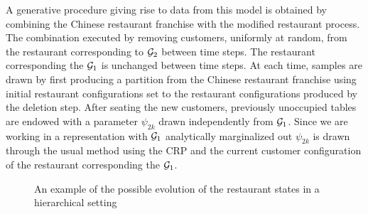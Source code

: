 A generative procedure giving rise to data from this model is obtained by combining the Chinese restaurant franchise with the modified restaurant process.  The combination executed by removing customers, uniformly at random, from the restaurant corresponding to $\G_2$ between time steps.  The restaurant corresponding the $\G_1$ is unchanged between time steps. At each time, samples are drawn by first producing a partition from the Chinese restaurant franchise using initial restaurant configurations set to the restaurant configurations produced by the deletion step.  After seating the new customers,  previously unoccupied tables are endowed with a parameter $\psi_{2k}$ drawn independently from $\G_1$.  Since we are working in a representation with $\G_1$ analytically marginalized out $\psi_{2k}$ is drawn through the usual method using the CRP and the current customer configuration of the restaurant corresponding the $\G_1$.


\begin{figure}[h!tbp] 
	\label{figVHPY}
	\begin{center}
		\caption{An example of the possible evolution of the restaurant states in a hierarchical setting}
	\end{center} 
\end{figure} 

